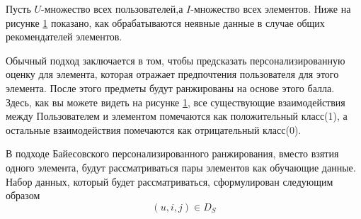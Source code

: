 Пусть ${U}$-множество всех пользователей,а ${I}$-множество всех 
элементов. Ниже на рисунке \ref{BPR1} показано, как обрабатываются неявные 
данные в случае общих рекомендателей элементов.
\begin{figure}[ht]
    \begin{center}
    
    \caption{
    \label{BPR1}
         }
    \end {center}
    \end {figure}
    Обычный подход заключается в том, чтобы предсказать
     персонализированную оценку для элемента, которая отражает 
     предпочтения пользователя для этого элемента. После этого 
     предметы будут ранжированы на основе этого балла. Здесь,
      как вы можете видеть на рисунке \ref{BPR1}, все существующие 
      взаимодействия между Пользователем и элементом помечаются как 
      положительный класс(1), а остальные взаимодействия помечаются
      как отрицательный класс(0).

      В подходе Байесовского
      персонализированного ранжирования, вместо взятия одного элемента, 
      будут рассматриваться пары элементов как обучающие данные.  Набор
         данных, который будет рассматриваться, сформулирован следующим
          образом 
          \begin{equation}
            (u,i,j) \in D_S
            \label{eq:1}
          \end{equation}
          
